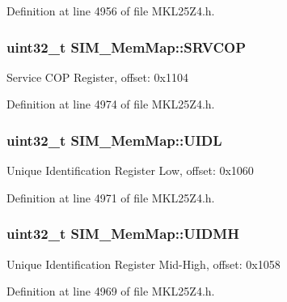 Definition at line 4956 of file M\+K\+L25\+Z4.\+h.

\subsubsection[{\texorpdfstring{S\+R\+V\+C\+OP}{SRVCOP}}]{\setlength{\rightskip}{0pt plus 5cm}uint32\+\_\+t S\+I\+M\+\_\+\+Mem\+Map\+::\+S\+R\+V\+C\+OP}\hypertarget{struct_s_i_m___mem_map_aa6f9efca2d70bfed14630de650d77ba8}{}\label{struct_s_i_m___mem_map_aa6f9efca2d70bfed14630de650d77ba8}
Service C\+OP Register, offset\+: 0x1104 

Definition at line 4974 of file M\+K\+L25\+Z4.\+h.

\subsubsection[{\texorpdfstring{U\+I\+DL}{UIDL}}]{\setlength{\rightskip}{0pt plus 5cm}uint32\+\_\+t S\+I\+M\+\_\+\+Mem\+Map\+::\+U\+I\+DL}\hypertarget{struct_s_i_m___mem_map_ac23a694afa8d84e55fc43ff0c0ec1b29}{}\label{struct_s_i_m___mem_map_ac23a694afa8d84e55fc43ff0c0ec1b29}
Unique Identification Register Low, offset\+: 0x1060 

Definition at line 4971 of file M\+K\+L25\+Z4.\+h.

\subsubsection[{\texorpdfstring{U\+I\+D\+MH}{UIDMH}}]{\setlength{\rightskip}{0pt plus 5cm}uint32\+\_\+t S\+I\+M\+\_\+\+Mem\+Map\+::\+U\+I\+D\+MH}\hypertarget{struct_s_i_m___mem_map_af4fb6d5bc3fa71f9c905570d87a2e93f}{}\label{struct_s_i_m___mem_map_af4fb6d5bc3fa71f9c905570d87a2e93f}
Unique Identification Register Mid-\/\+High, offset\+: 0x1058 

Definition at line 4969 of file M\+K\+L25\+Z4.\+h.

